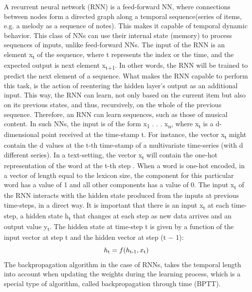     
    A recurrent neural network (RNN) is a feed-forward NN, where connections between nodes form a directed graph along a temporal sequence(series of items, e.g. a melody as a sequence of notes). This makes it capable of temporal dynamic behavior. This class of NNs can use their internal state (memory) to process sequences of inputs, unlike feed-forward NNs. The input of the RNN is an element x\textsubscript{t} of the sequence, where t represents the index or the time, and the expected output is next element x\textsubscript{t+1}. In other words, the RNN will be trained to predict the next element of a sequence. What makes the RNN capable to perform this task, is the action of reentering the hidden layer's output as an additional input. This way, the RNN can learn, not only based on the current item but also on its previous states, and thus, recursively, on the whole of the previous sequence. Therefore, an RNN can learn sequences, such as those of musical content. In such NNs, the input is of the form x\textsubscript{1} . . . x\textsubscript{n}, where x\textsubscript{t} is a d-dimensional point received at the time-stamp t. For instance, the vector x\textsubscript{t} might contain the d values at the t-th time-stamp of a multivariate time-series (with d different series). In a text-setting, the vector x\textsubscript{t} will contain the one-hot representation of the word at the t-th step . When a word is one-hot encoded, in a vector of length equal to the lexicon size, the component for this particular word has a value of 1 and all other components has a value of 0. The input x\textsubscript{t} of the RNN interacts with the hidden state produced from the inputs at previous time-steps, in a direct way. It is important that there is an input x\textsubscript{t} at each time-step, a hidden state h\textsubscript{t} that changes at each step as new data arrives and an output value y\textsubscript{t}. The hidden state at time-step t is given by a function of the input vector at step t and the hidden vector at step (t − 1): 
    \begin{equation}
        h\textsubscript{t} = f(h\textsubscript{t-1},x\textsubscript{t})
    \end{equation}
    The backpropagation algorithm in the case of RNNs, takes the temporal length into account when updating the weights during the learning process, which is a special type of algorithm, called backpropagation through time (BPTT).
    
